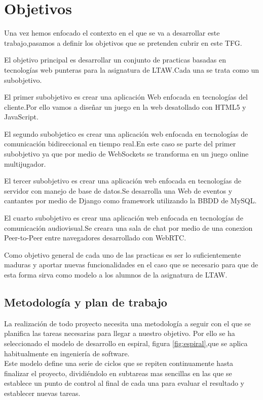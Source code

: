 \chapter{Objetivos} 
Una vez  hemos enfocado el contexto en el que se va a desarrollar este trabajo,pasamos a definir los objetivos que se pretenden cubrir en este TFG.

El objetivo principal es desarrollar un conjunto de practicas basadas en tecnologías web punteras para la asignatura de LTAW.Cada una se trata como un subobjetivo.

El primer subobjetivo es crear una aplicación Web enfocada en tecnologías del cliente.Por ello vamos a diseñar un juego en la web desatollado con HTML5 y JavaScript.

El segundo subobjetico es crear una aplicación web enfocada en tecnologías de comunicación bidireccional en tiempo real.En este caso se parte del primer subobjetivo ya que por medio de WebSockets se transforma en un juego online multijugador.

El tercer subobjetivo es crear una aplicación web enfocada en tecnologías de servidor con manejo de base de datos.Se desarrolla una Web de eventos y cantantes por medio de Django como framework utilizando la BBDD de MySQL.

El cuarto subobjetivo es crear una aplicación web enfocada en tecnologías de comunicación audiovisual.Se creara una sala de chat por medio de una conexion Peer-to-Peer entre navegadores desarrollado con WebRTC.

Como objetivo general de cada uno de las practicas es ser lo suficientemente maduras y aportar nuevas funcionalidades en el caso que se necesario para que de esta forma sirva como modelo a los alumnos de la asignatura de LTAW.
\section{Metodología y plan de trabajo}
La realización de todo proyecto necesita una metodología a seguir con el que se planifica las tareas necesarias para llegar a nuestro objetivo. Por ello se ha seleccionado el modelo de desarrollo en espiral, figura \ref{fig:espiral},que se aplica habitualmente en ingeniería de software.
\\Este modelo define una serie de ciclos que se repiten continuamente hasta finalizar el proyecto, dividiéndolo en subtareas mas sencillas en las que se establece un punto de control al final de cada una para evaluar el resultado y establecer nuevas tareas.

